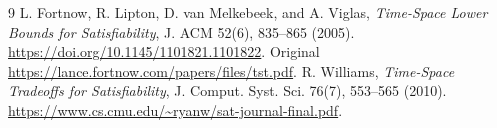 \documentclass[11pt]{article}
\begin{document}
\begin{thebibliography}{9}\small
{} L. Fortnow, R. Lipton, D. van Melkebeek,
and A. Viglas, \emph{Time-Space Lower Bounds
for Satisfiability}, J. ACM 52(6), 835--865 (2005).
\url{https://doi.org/10.1145/1101821.1101822}.
Original \url{https://lance.fortnow.com/papers/files/tst.pdf}.
 R. Williams, \emph{Time-Space
Tradeoffs for Satisfiability}, J. Comput. Syst.
Sci. 76(7), 553--565 (2010).
\url{https://www.cs.cmu.edu/~ryanw/sat-journal-final.pdf}.
\end{thebibliography}
\end{document}
